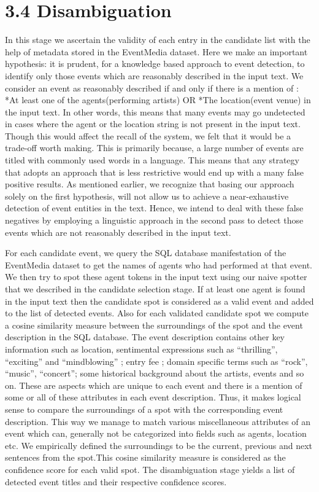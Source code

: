 \documentclass[a4paper,11pt]{report}
\begin{document}

\section*{3.4 Disambiguation}

In this stage we ascertain the validity of each entry in the candidate list with the help of metadata stored in the EventMedia dataset. Here we make an important hypothesis: it is prudent, for a knowledge based approach to event detection, to identify only those events which are reasonably described in the input text. We consider an event as reasonably described if and only if there is a mention of :
*At least one of the agents(performing artists)  OR *The location(event venue) in the input text. In other words, this means that many events may go undetected in cases where the agent or the location string is not present in the input text. Though this would affect the recall of the system, we felt that it would be a trade-off worth making. This is primarily because, a large number of events are titled with commonly used words in a language. This means that any strategy that adopts an approach that is less restrictive would end up with a many false positive results. As mentioned earlier, we recognize that basing our approach solely on the first hypothesis, will not allow us to achieve a near-exhaustive detection of event entities in the text. Hence, we intend to deal with these false negatives by employing a linguistic approach in the second pass to detect those events which are not reasonably described in the input text.

For each candidate event, we query the SQL database manifestation of the EventMedia dataset to get the names of agents who had performed at that event. We then try to spot these  agent tokens in the input text using our naive spotter that we described in the candidate selection stage. If at least one agent is found in the input text then the candidate spot is considered as a valid event and added to the list of detected events. Also for each validated candidate spot we compute a cosine similarity measure between the surroundings of the spot and the event description in the SQL database. The event description contains other key information such as location, sentimental expressions such as ``thrilling'', ``exciting'' and ``mindblowing'' ; entry fee ; domain specific terms such as ``rock'', ``music'', ``concert''; some historical background about the artists, events and so on. These are aspects which are unique to each event and there is a mention of some or all of these attributes in each event description. Thus, it makes logical sense to compare the surroundings of a spot with the corresponding event description. This way we manage to match various miscellaneous attributes of an event which can, generally not be categorized into fields such as agents, location etc. We empirically defined the surroundings to be the current, previous and next sentences from the spot.This cosine similarity measure is considered as the confidence score for each valid spot. The disambiguation stage yields a list of detected event titles and their respective confidence scores.
\end{document}
